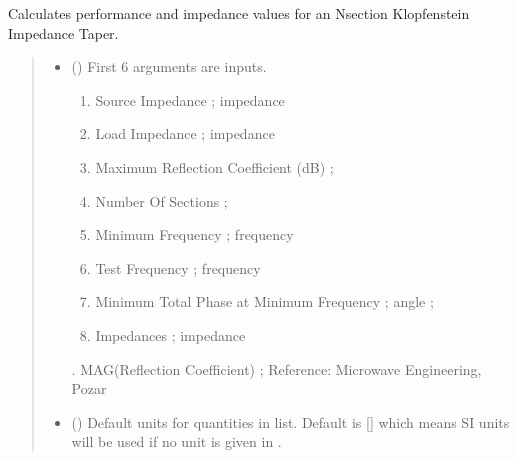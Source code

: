 \documentclass[letterpaper,10pt,english]{sphinxmanual}
\begin{document}
\begin{fulllineitems}
\label{\detokenize{components:components.Klopfenstein_Taper_Impedance_Transformer}}
\pysigstartsignatures
{}
\pysigstopsignatures
\sphinxAtStartPar
Calculates performance and impedance values for an N\sphinxhyphen{}section Klopfenstein Impedance Taper.
\begin{quote}\begin{description}
\begin{itemize}
\item {} 
\sphinxAtStartPar
{} () \textendash{} 
\sphinxAtStartPar
First 6 arguments are inputs.
\begin{enumerate}
%
\item {} 
\sphinxAtStartPar
Source Impedance ; impedance

\item {} 
\sphinxAtStartPar
Load Impedance ; impedance

\item {} 
\sphinxAtStartPar
Maximum Reflection Coefficient (dB) ;

\item {} 
\sphinxAtStartPar
Number Of Sections ;

\item {} 
\sphinxAtStartPar
Minimum Frequency ; frequency

\item {} 
\sphinxAtStartPar
Test Frequency ; frequency

\item {} 
\sphinxAtStartPar
Minimum Total Phase at Minimum Frequency ; angle ;

\item {} 
\sphinxAtStartPar
Impedances ; impedance

\end{enumerate}

.  MAG(Reflection Coefficient) ;
Reference:  Microwave Engineering, Pozar


\item {} 
\sphinxAtStartPar
{} (\sphinxstyleliteralemphasis{\sphinxupquote{, }}) \textendash{} Default units for quantities in  list. Default is {[}{]} which means SI units will be used if no unit is given in .


\end{itemize}
\end{description}
\end{quote}
\end{fulllineitems}
\end{document}

